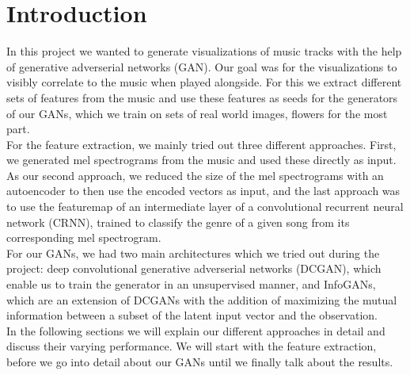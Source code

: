 \chapter{Introduction}
  In this project we wanted to generate visualizations of music tracks with the help of generative adverserial networks (GAN). 
  Our goal was for the visualizations to visibly correlate to the music when played alongside.
  For this we extract different sets of features from the music and use these features as seeds for the generators of our GANs, which we train on sets of real world images, flowers for the most part.\\
  For the feature extraction, we mainly tried out three different approaches. First, we generated mel spectrograms from the music and used these directly as input. 
  As our second approach, we reduced the size of the mel spectrograms with an autoencoder to then use the encoded vectors as input, and the last approach was to use the featuremap of an intermediate layer of a convolutional recurrent neural network (CRNN), trained to classify the genre of a given song from its corresponding mel spectrogram.\\
  For our GANs, we had two main architectures which we tried out during the project: deep convolutional generative adverserial networks (DCGAN), which enable us to train the generator in an unsupervised manner, and InfoGANs, which are an extension of DCGANs with the addition of maximizing
  the mutual information between a subset of the latent input vector and the observation.\\
  In the following sections we will explain our different approaches in detail and discuss their varying performance. We will start with the feature extraction, before we go into detail about our GANs until we finally talk about the results.